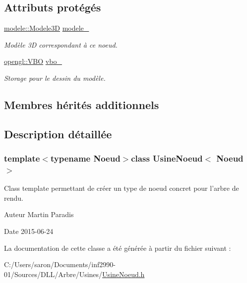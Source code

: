 \subsection*{Attributs protégés}
\begin{DoxyCompactItemize}
\item 
\hypertarget{class_usine_noeud_a41150bf720451994fc944328e5966de7}{\hyperlink{classmodele_1_1_modele3_d}{modele\-::\-Modele3\-D} \hyperlink{class_usine_noeud_a41150bf720451994fc944328e5966de7}{modele\-\_\-}}\label{class_usine_noeud_a41150bf720451994fc944328e5966de7}

\begin{DoxyCompactList}\small\item\em Modèle 3\-D correspondant à ce noeud. \end{DoxyCompactList}\item 
\hypertarget{class_usine_noeud_a255ba23be7c197be82afdd3e7de6a651}{\hyperlink{classopengl_1_1_v_b_o}{opengl\-::\-V\-B\-O} \hyperlink{class_usine_noeud_a255ba23be7c197be82afdd3e7de6a651}{vbo\-\_\-}}\label{class_usine_noeud_a255ba23be7c197be82afdd3e7de6a651}

\begin{DoxyCompactList}\small\item\em Storage pour le dessin du modèle. \end{DoxyCompactList}\end{DoxyCompactItemize}
\subsection*{Membres hérités additionnels}


\subsection{Description détaillée}
\subsubsection*{template$<$typename Noeud$>$class Usine\-Noeud$<$ Noeud $>$}

Class template permettant de créer un type de noeud concret pour l'arbre de rendu. 

\begin{DoxyAuthor}{Auteur}
Martin Paradis 
\end{DoxyAuthor}
\begin{DoxyDate}{Date}
2015-\/06-\/24 
\end{DoxyDate}


La documentation de cette classe a été générée à partir du fichier suivant \-:\begin{DoxyCompactItemize}
\item 
C\-:/\-Users/saron/\-Documents/inf2990-\/01/\-Sources/\-D\-L\-L/\-Arbre/\-Usines/\hyperlink{_usine_noeud_8h}{Usine\-Noeud.\-h}\end{DoxyCompactItemize}
